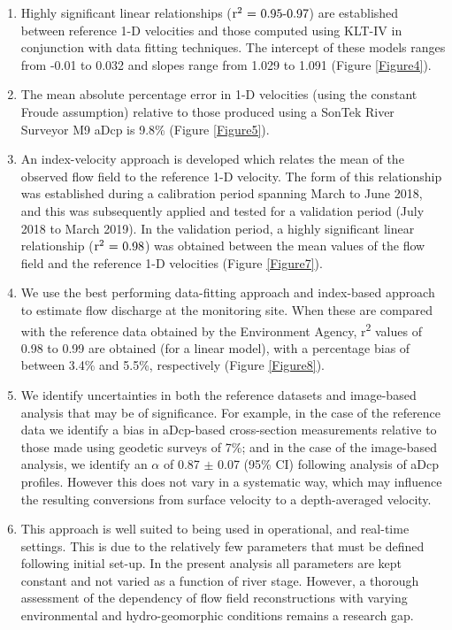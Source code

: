 \documentclass[hess, manuscript]{copernicus} %
\begin{document}
\begin{enumerate}
    \item Highly significant linear relationships (${\textnormal{r\textsuperscript{2} = 0.95-0.97}}$) are established between reference 1-D velocities and those computed using KLT-IV in conjunction with data fitting techniques. The intercept of these models ranges from -0.01 to 0.032 and slopes range from 1.029 to 1.091 (Figure \ref{Figure4}). 
    \item The mean absolute percentage error in 1-D velocities (using the constant Froude assumption) relative to those produced using a SonTek River Surveyor M9 aDcp is 9.8\% (Figure \ref{Figure5}).    
    \item An index-velocity approach is developed which relates the mean of the observed flow field to the reference 1-D velocity. The form of this relationship was established during a calibration period spanning March to June 2018, and this was subsequently applied and tested for a validation period (July 2018 to March 2019). In the validation period, a highly significant linear relationship (${\textnormal{r\textsuperscript{2} = 0.98}}$) was obtained between the mean values of the flow field and the reference 1-D velocities (Figure \ref{Figure7}).
    \item We use the best performing data-fitting approach and index-based approach to estimate flow discharge at the monitoring site. When these are compared with the reference data obtained by the Environment Agency, r\textsuperscript{2} values of 0.98 to 0.99 are obtained (for a linear model), with a percentage bias of between 3.4\% and 5.5\%, respectively (Figure \ref{Figure8}).
    \item We identify uncertainties in both the reference datasets and image-based analysis that may be of significance. For example, in the case of the reference data we identify a bias in aDcp-based cross-section measurements relative to those made using geodetic surveys of 7\%; and in the case of the image-based analysis, we identify an $\alpha$ of 0.87 $\pm$ 0.07 (95\% CI) following analysis of aDcp profiles. However this does not vary in a systematic way, which may influence the resulting conversions from surface velocity to a depth-averaged velocity. 
    \item This approach is well suited to being used in operational, and real-time settings. This is due to the relatively few parameters that must be defined following initial set-up. In the present analysis all parameters are kept constant and not varied as a function of river stage. However, a thorough assessment of the dependency of flow field reconstructions with varying environmental and hydro-geomorphic conditions remains a research gap. 
\end{enumerate}
\end{document}
